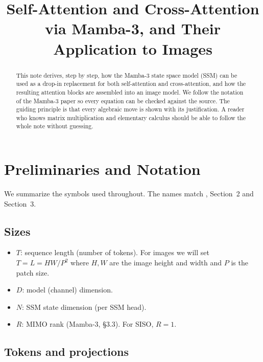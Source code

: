 \documentclass[11pt,a4paper]{article}
\title{Self-Attention and Cross-Attention via Mamba-3, and Their Application to Images}
\author{}
\date{}
\begin{document}
\maketitle

\begin{abstract}
This note derives, step by step, how the Mamba-3 state space model
(SSM) can be used as a drop-in replacement for both self-attention and
cross-attention, and how the resulting attention blocks are assembled
into an image model. We follow the notation of the Mamba-3 paper
\cite{mamba3} so every equation can be
checked against the source. The guiding principle is that every
algebraic move is shown with its justification. A reader who knows
matrix multiplication and elementary calculus should be able to follow
the whole note without guessing.
\end{abstract}

\tableofcontents

\section{Preliminaries and Notation}

We summarize the symbols used throughout. The names match
\cite{mamba3}, Section~2 and Section~3.

\subsection{Sizes}

\begin{itemize}
  \item $T$: sequence length (number of tokens). For images we will
        set $T = L = HW/P^2$ where $H,W$ are the image height and
        width and $P$ is the patch size.
  \item $D$: model (channel) dimension.
  \item $N$: SSM state dimension (per SSM head).
  \item $R$: MIMO rank (Mamba-3, \S 3.3). For SISO, $R=1$.
\end{itemize}

\subsection{Tokens and projections}
\end{document}
